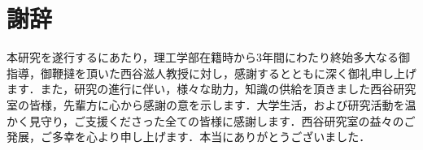 \chapter*{謝辞} 
本研究を遂行するにあたり，理工学部在籍時から3年間にわたり終始多大なる御指導，御鞭撻を頂いた西谷滋人教授に対し，感謝するとともに深く御礼申し上げます．また，研究の進行に伴い，様々な助力，知識の供給を頂きました西谷研究室の皆様，先輩方に心から感謝の意を示します．大学生活，および研究活動を温かく見守り，ご支援くださった全ての皆様に感謝します．西谷研究室の益々のご発展，ご多幸を心より申し上げます．本当にありがとうございました．